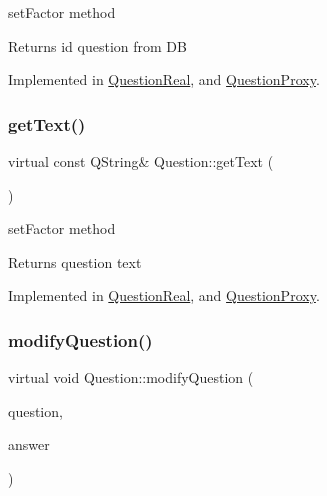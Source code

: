 set\+Factor method 

\begin{DoxyReturn}{Returns}
id question from DB 
\end{DoxyReturn}


Implemented in \hyperlink{class_question_real_abc9b0cc639161eb99a2c256c4b8579ed}{Question\+Real}, and \hyperlink{class_question_proxy_a720f1ae28f66770e40859fd19945450c}{Question\+Proxy}.

\mbox{\label{class_question_a23e84af04f16e0dee933844d5c46b370}} 
\subsubsection{\texorpdfstring{get\+Text()}{getText()}}
{\footnotesize\ttfamily virtual const Q\+String\& Question\+::get\+Text (\begin{DoxyParamCaption}{ }\end{DoxyParamCaption})\hspace{0.3cm}{\ttfamily [pure virtual]}}



set\+Factor method 

\begin{DoxyReturn}{Returns}
question text 
\end{DoxyReturn}


Implemented in \hyperlink{class_question_real_aeeecdcaca7e7c3dd1d29794a662b2af1}{Question\+Real}, and \hyperlink{class_question_proxy_ac5fc3eeef47b1955b116599cb860aa4e}{Question\+Proxy}.

\mbox{\label{class_question_ae3724056374e2e9160f4d7250241f9ab}} 
\subsubsection{\texorpdfstring{modify\+Question()}{modifyQuestion()}}
{\footnotesize\ttfamily virtual void Question\+::modify\+Question (\begin{DoxyParamCaption}\item[{const Q\+String \&}]{question,  }\item[{const Q\+String \&}]{answer }\end{DoxyParamCaption})\hspace{0.3cm}{\ttfamily [pure virtual]}}



